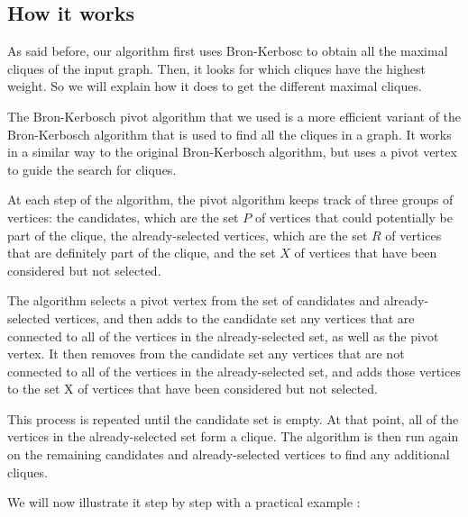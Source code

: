 \subsection{How it works}

As said before, our algorithm first uses Bron-Kerbosc to obtain all the maximal 
cliques of the input graph. Then, it looks for which cliques have the highest weight.
So we will explain how it does to get the different maximal cliques. \newline

The Bron-Kerbosch pivot algorithm that we used is a more efficient variant of 
the Bron-Kerbosch algorithm that is used to find all the cliques in a graph. 
It works in a similar way to the original Bron-Kerbosch algorithm, but uses a 
pivot vertex to guide the search for cliques. \newline

At each step of the algorithm, the pivot algorithm keeps track of three groups 
of vertices: the candidates, which are the set $P$ of vertices that could 
potentially be part of the clique, the already-selected vertices, which are the 
set $R$ of vertices that are definitely part of the clique, and the set $X$ of 
vertices that have been considered but not selected. \newline

The algorithm selects a pivot vertex from the set of candidates and already-selected 
vertices, and then adds to the candidate set any vertices that are connected to 
all of the vertices in the already-selected set, as well as the pivot vertex. 
It then removes from the candidate set any vertices that are not connected to all 
of the vertices in the already-selected set, and adds those vertices to the set X 
of vertices that have been considered but not selected. \newline

This process is repeated until the candidate set is empty. At that point, all of 
the vertices in the already-selected set form a clique. The algorithm is then run 
again on the remaining candidates and already-selected vertices to find any 
additional cliques. \newline

We will now illustrate it step by step with a practical example : \newline

